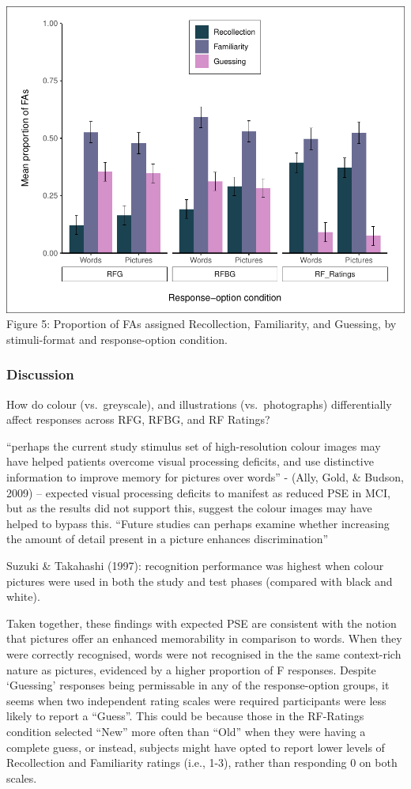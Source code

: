 \documentclass[
  11pt,
]{article}
\begin{document}
\includegraphics{R--Thesis_files/figure-latex/unnamed-chunk-19-1.pdf}
Figure 5: Proportion of FAs assigned Recollection, Familiarity, and
Guessing, by stimuli-format and response-option condition.

\hypertarget{discussion}{%
\subsubsection{Discussion}\label{discussion}}

How do colour (vs.~greyscale), and illustrations (vs.~photographs)
differentially affect responses across RFG, RFBG, and RF Ratings?

``perhaps the current study stimulus set of high-resolution colour
images may have helped patients overcome visual processing deficits, and
use distinctive information to improve memory for pictures over words''
- (Ally, Gold, \& Budson, 2009) -- expected visual processing deficits
to manifest as reduced PSE in MCI, but as the results did not support
this, suggest the colour images may have helped to bypass this. ``Future
studies can perhaps examine whether increasing the amount of detail
present in a picture enhances discrimination''

Suzuki \& Takahashi (1997): recognition performance was highest when
colour pictures were used in both the study and test phases (compared
with black and white).

Taken together, these findings with expected PSE are consistent with the
notion that pictures offer an enhanced memorability in comparison to
words. When they were correctly recognised, words were not recognised in
the the same context-rich nature as pictures, evidenced by a higher
proportion of F responses. Despite `Guessing' responses being
permissable in any of the response-option groups, it seems when two
independent rating scales were required participants were less likely to
report a ``Guess''. This could be because those in the RF-Ratings
condition selected ``New'' more often than ``Old'' when they were having
a complete guess, or instead, subjects might have opted to report lower
levels of Recollection and Familiarity ratings (i.e., 1-3), rather than
responding 0 on both scales.
\end{document}
